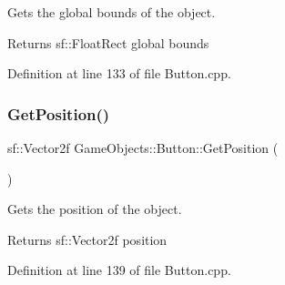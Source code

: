 Gets the global bounds of the object. 

\begin{DoxyReturn}{Returns}
sf\+::\+Float\+Rect global bounds \begin{DoxyVerb}\end{DoxyVerb}
 
\end{DoxyReturn}


Definition at line 133 of file Button.\+cpp.


\begin{DoxyCode}{0}

\end{DoxyCode}
\mbox{\label{class_game_objects_1_1_button_afd9cb38464fbbd3dd97c8df38ab94779}} 
\subsubsection{\texorpdfstring{GetPosition()}{GetPosition()}}
{\footnotesize\ttfamily sf\+::\+Vector2f Game\+Objects\+::\+Button\+::\+Get\+Position (\begin{DoxyParamCaption}{ }\end{DoxyParamCaption})}



Gets the position of the object. 

\begin{DoxyReturn}{Returns}
sf\+::\+Vector2f position \begin{DoxyVerb}\end{DoxyVerb}
 
\end{DoxyReturn}


Definition at line 139 of file Button.\+cpp.


\begin{DoxyCode}{0}

\end{DoxyCode}
\mbox{\label{class_game_objects_1_1_button_abdbfc955cf954a59f8ac319954dcd25c}} 
